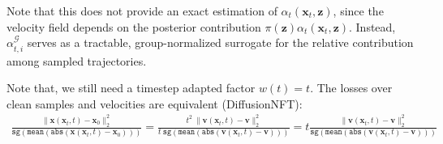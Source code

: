 \documentclass{article} %
\begin{document}
{\color{red}
Note that this does not provide an exact estimation of
$\alpha_t(\mathbf{x}_t,\mathbf z)$, since the velocity field depends on the
posterior contribution $\pi(\mathbf z)\alpha_t(\mathbf{x}_t,\mathbf z)$.
Instead, $\alpha_{t,i}^{\mathcal G}$ serves as a tractable, group-normalized
surrogate for the relative contribution among sampled trajectories.
}

{\color{red}Note that, we still need a timestep adapted factor $w(t) = t$.
The losses over clean samples
and velocities
are equivalent (DiffusionNFT):
\begin{align}
    \frac{
    \|\mathbf{x}(\mathbf{x}_t,t) - \mathbf{x}_0
    \|_2^2
    }
    {
    \texttt{sg}(\texttt{mean}
    (\texttt{abs}(
    \mathbf{x}(\mathbf{x}_t,t) - \mathbf{x}_0
    )
    ))
    }
    = 
    \frac{t^2~
    \|\mathbf{v}(\mathbf{x}_t,t) - \mathbf{v}
    \|_2^2
    }
    {t~
    \texttt{sg}(\texttt{mean}
    (\texttt{abs}(
    \mathbf{v}(\mathbf{x}_t,t) - \mathbf{v}
    )
    ))
    }
    = 
    t
    \frac{
    \|\mathbf{v}(\mathbf{x}_t,t) - \mathbf{v}
    \|_2^2
    }
    {
    \texttt{sg}(\texttt{mean}
    (\texttt{abs}(
    \mathbf{v}(\mathbf{x}_t,t) - \mathbf{v}
    )
    ))
    }
\end{align}
}

\newpage
\clearpage
\end{document}
